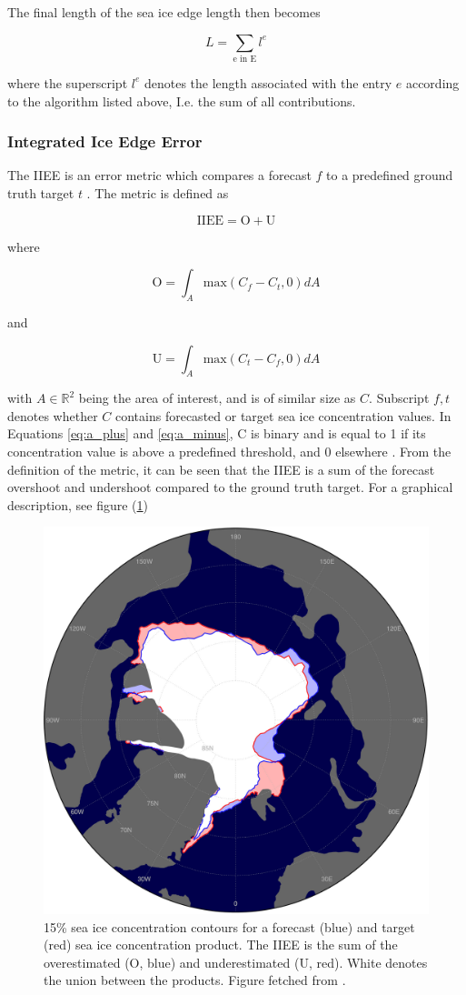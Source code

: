 \documentclass[../main/thesis.tex]{subfiles}
\begin{document}
The final length of the sea ice edge length then becomes

\begin{equation}
    \label{eq:ice-edge-length}
    L = \sum_\text{e in E} l^e
\end{equation}

where the superscript $l^e$ denotes the length associated with the entry $e$ according to the algorithm listed above, I.e. the sum of all contributions.

\subsubsection{Integrated Ice Edge Error}
\label{sec:iiee}
The IIEE is an error metric which compares a forecast $f$ to a predefined ground truth target $t$ \citet{Goessling2016}. The metric is defined as

\begin{equation}
    \label{eq:IIEE}
    \text{IIEE} = \text{O} + \text{U}
\end{equation}

where 

\begin{equation}
    \label{eq:a_plus}
    \text{O} = \int_A\text{max}(C_f - C_t, 0)dA
\end{equation}

and

\begin{equation}
    \label{eq:a_minus}
    \text{U} = \int_A\text{max}(C_t - C_f, 0)dA
\end{equation}

with $A \in{\mathbb{R}^2}$ being the area of interest, and is of similar size as $C$. Subscript $f,t$ denotes whether $C$ contains forecasted or target sea ice concentration values. In Equations \ref{eq:a_plus} and \ref{eq:a_minus}, C is binary and is equal to 1 if its concentration value is above a predefined threshold, and 0 elsewhere \citep{Goessling2016}. From the definition of the metric, it can be seen that the IIEE is a sum of the forecast overshoot and undershoot compared to the ground truth target. For a graphical description, see figure (\ref{fig:goessling_iiee})

\begin{figure}
    \centering
    \includegraphics[width=.4\textwidth]{goessling_iiee}
    \caption{\label{fig:goessling_iiee}15\% sea ice concentration contours for a forecast (blue) and target (red) sea ice concentration product. The IIEE is the sum of the overestimated (O, blue) and underestimated (U, red). White denotes the union between the products. Figure fetched from \protect\citep{Goessling2016}.}
\end{figure}
\end{document}
